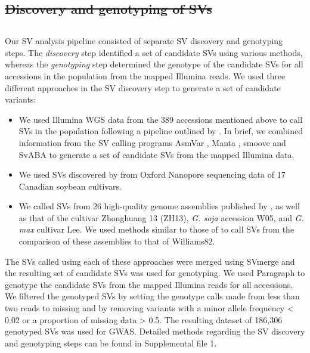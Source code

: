 \documentclass{article}
\providecommand{\DIFaddtex}[1]{{\protect\color{blue}\uwave{#1}}} %
\providecommand{\DIFdeltex}[1]{{\protect\color{red}\sout{#1}}}                      %
\providecommand{\DIFaddbegin}{} %
\providecommand{\DIFaddend}{} %
\providecommand{\DIFdelbegin}{} %
\providecommand{\DIFdelend}{} %
\providecommand{\DIFadd}[1]{\texorpdfstring{\DIFaddtex{#1}}{#1}} %
\providecommand{\DIFdel}[1]{\texorpdfstring{\DIFdeltex{#1}}{}} %
\newcommand{\DIFscaledelfig}{0.5}
\newlength{\DIFdelgraphicswidth} %
\newlength{\DIFdelgraphicsheight} %
\newcommand{\DIFaddincludegraphics}[2][]{{\color{blue}\fbox{\DIFOincludegraphics[#1]{#2}}}} %
\newcommand{\DIFdelincludegraphics}[2][]{%
\sbox{\DIFdelgraphicsbox}{\DIFOincludegraphics[#1]{#2}}%
\settoboxwidth{\DIFdelgraphicswidth}{\DIFdelgraphicsbox} %
\settoboxtotalheight{\DIFdelgraphicsheight}{\DIFdelgraphicsbox} %
\scalebox{\DIFscaledelfig}{%
\parbox[b]{\DIFdelgraphicswidth}{\usebox{\DIFdelgraphicsbox}\\[-\baselineskip] \rule{\DIFdelgraphicswidth}{0em}}\llap{\resizebox{\DIFdelgraphicswidth}{\DIFdelgraphicsheight}{%
\setlength{\unitlength}{\DIFdelgraphicswidth}%
\begin{picture}(1,1)%
\thicklines\linethickness{2pt} %
{\color[rgb]{1,0,0}\put(0,0){\framebox(1,1){}}}%
{\color[rgb]{1,0,0}\put(0,0){\line( 1,1){1}}}%
{\color[rgb]{1,0,0}\put(0,1){\line(1,-1){1}}}%
\end{picture}%
}\hspace*{3pt}}} %
} %
\DeclareRobustCommand{\DIFaddbegin}{\DIFOaddbegin \let\includegraphics\DIFaddincludegraphics} %
\DeclareRobustCommand{\DIFaddend}{\DIFOaddend \let\includegraphics\DIFOincludegraphics} %
\DeclareRobustCommand{\DIFdelbegin}{\DIFOdelbegin \let\includegraphics\DIFdelincludegraphics} %
\DeclareRobustCommand{\DIFdelend}{\DIFOaddend \let\includegraphics\DIFOincludegraphics} %
\begin{document}
\DIFdelbegin \subsection*{\DIFdel{Discovery and genotyping of SVs}}
\DIFdelend \DIFaddbegin \subsection{\DIFadd{Discovery and genotyping of SVs}}
\DIFaddend 

Our SV analysis pipeline consisted of separate SV discovery and genotyping steps.
The \emph{discovery} step identified a set of candidate SVs using various methods,
whereas the \emph{genotyping} step determined the genotype
of the candidate SVs for all accessions in the population from the mapped Illumina reads. We used three different
approaches in the SV discovery step to generate a set of candidate variants:

\begin{itemize}
	\item We used Illumina WGS data from the 389 accessions mentioned above
		to call SVs in the population following a pipeline outlined
		by . In brief, we combined information from
		the SV calling programs AsmVar , Manta ,
		smoove  and SvABA  to generate
		a set of candidate SVs from the mapped Illumina data.
	\item We used SVs discovered by  from Oxford Nanopore
		sequencing data of 17 Canadian soybean cultivars.
	\item We called SVs from 26 high-quality genome assemblies published by
		, as well as that of the cultivar Zhonghuang 13 (ZH13),
		\textit{G. soja} accession W05, and \textit{G. max} cultivar Lee.
		We used methods similar to those of  to call
		SVs from the comparison of these assemblies to that of Williams82.
\end{itemize}

The SVs called using each of these approaches were merged using SVmerge
 and the resulting set of candidate SVs was used for
genotyping. We used Paragraph  to genotype the candidate SVs
from the mapped Illumina reads for all accessions. We filtered the genotyped
SVs by setting the genotype calls made from less than two reads to missing and
by removing variants with a minor allele frequency < 0.02 or a proportion of
missing data > 0.5. The resulting dataset of 186,306 genotyped SVs was used for
GWAS. Detailed methods regarding the SV discovery and genotyping steps can be
found in Supplemental file 1.
\end{document}
